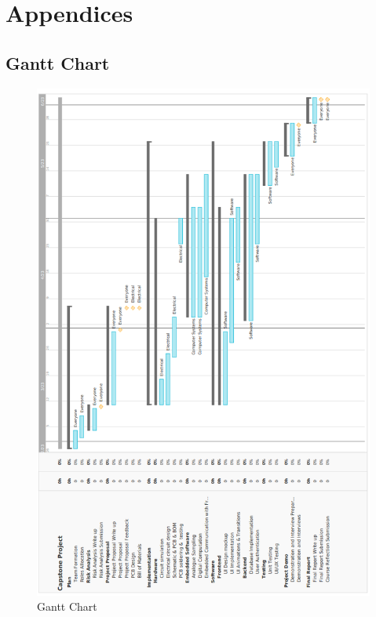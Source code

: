 
\graphicspath{ {./parts/} }

\part{Appendices}

\chapter{Gantt Chart}

\begin{figure}[h]
\centering
\includegraphics[width=\textwidth]{proposal/parts/Capstone_Project_Gantt_Chart_Hor.png}
\caption{Gantt Chart}
\end{figure}


